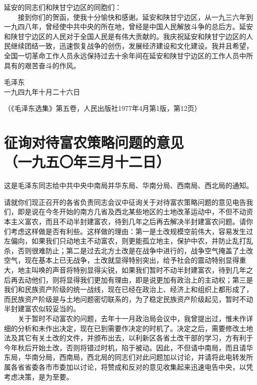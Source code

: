 \documentclass[cn,11pt,chinese]{elegantbook}
\def\myformat#1{\hfil\hfil #1}
\begin{document}
延安的同志们和陕甘宁边区的同胞们：\\
　　接到你们的贺函，使我十分愉快和感谢。延安和陕甘宁边区，从一九三六年到一九四八年，曾经使中共中央的所在地，曾经是中国人民解放斗争的总后方。延安和陕甘宁边区的人民对于全国人民是有伟大贡献的。我庆祝延安和陕甘宁边区的人民继续团结一致，迅速恢复战争的创伤，发展经济建设和文化建设。我并且希望，全国一切革命工作人员永远保持过去十余年间在延安和陕甘宁边区的工作人员中所具有的艰苦奋斗的作风。\\
\begin{flushright}
毛泽东\\一九四九年十月二十六日
\end{flushright}

\begin{flushright}（《毛泽东选集》第五卷，人民出版社1977年4月第1版，第12页）\end{flushright}
\newpage\section*{\myformat{征询对待富农策略问题的意见}\\\myformat{（一九五〇年三月十二日）}}
\begin{introduction}\item  这是毛泽东同志给中共中央中南局并华东局、华南分局、西南局、西北局的通知。\end{introduction}
请就你们现正召开的各省负责同志会议中征询关于对待富农策略问题的意见电告我们，即是说在今冬开始的南方几省及西北某些地区的土地改革运动中，不但不动资本主义富农，而且不动半封建富农，待到几年之后再去解决半封建富农问题。请你们考虑这样做是否有利些。这样做的理由：第一是土改规模空前伟大，容易发生过左偏向，如果我们只动地主不动富农，则更能孤立地主，保护中农，并防止乱打乱杀，否则很难防止；第二是过去北方土改是在战争中进行的，战争空气掩盖了土改空气，现在基本上已无战争，土改就显得特别突出，给予社会的震动特别显得重大，地主叫唤的声音将特别显得尖锐，如果我们暂时不动半封建富农，待到几年之后再去动他们，则将显得我们更加有理由，即是说更加有政治上的主动权；第三是我们和民族资产阶级的统一战线，现在已经在政治上、经济上和组织上都形成了，而民族资产阶级是与土地问题密切联系的，为了稳定民族资产阶级起见，暂时不动半封建富农似较妥当的。\\
　　关于暂时不动富农的问题，去年十一月政治局会议中，我曾提出过，惟未作详细的分析和未作出决定，现在已到需要作决定的时机了。决定之后，需要修改土地法及其它有关土改的文件，并颁布出去，以利新区各省土改干部的学习，方有利于今年秋后开始土改，否则将错过时机，陷于被动。因此，不但请中南局，而且请华东局，华南分局，西南局，西北局的同志们对此问题加以讨论，并请将此电转发所属各省省委各市市委加以讨论，将赞成和反对的意见收集起来迅速电告中央，以凭考虑决策，是为至要。\\
\end{document}

